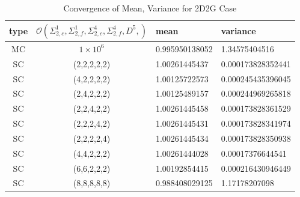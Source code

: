\begin{table}[H]
\begin{center}
\begin{tabular}{c c|l l}
type & $\mathcal{O}(\Sigma_{2,c}^1,\Sigma_{2,f}^1,\Sigma_{2,c}^4,\Sigma_{2,f}^4,D^5,)$ & mean & variance \\ \hline
MC & $1\times10^6$ & 0.995950138052 & 1.34575404516 \\
SC & (2,2,2,2,2)  & 1.00261445437 & 0.000173828352441 \\
SC & (4,2,2,2,2)  & 1.00125722573 & 0.000245435396045 \\
SC & (2,4,2,2,2)  & 1.00125489157 & 0.000244969265818 \\
SC & (2,2,4,2,2)  & 1.00261445458 & 0.000173828361529 \\
SC & (2,2,2,4,2)  & 1.00261445431 & 0.000173828341974 \\
SC & (2,2,2,2,4)  & 1.00261445434 & 0.000173828350938 \\
SC & (4,4,2,2,2)  & 1.00261444028 & 0.00017376644541\\
SC & (6,6,2,2,2)  & 1.00192854415 & 0.000216430946449 \\
SC & (8,8,8,8,8) & 0.988408029125 & 1.17178207098
\end{tabular}
\end{center}
\caption{Convergence of Mean, Variance for 2D2G Case}
\label{tab:2dcrit}
\end{table}
%
%
